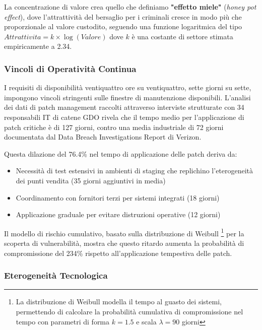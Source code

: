 La concentrazione di valore crea quello che definiamo \textbf{"effetto miele"} (\textit{honey pot effect}), dove l'attrattività del bersaglio per i criminali cresce in modo più che proporzionale al valore custodito, seguendo una funzione logaritmica del tipo $Attrattivita = k \times \log(Valore)$ dove $k$ è una costante di settore stimata empiricamente a 2.34.

\subsubsection{\texorpdfstring{Vincoli di Operatività Continua}{2.2.2.2 - Vincoli di Operatività Continua}}

I requisiti di disponibilità ventiquattro ore su ventiquattro, sette giorni su sette, impongono vincoli stringenti sulle finestre di manutenzione disponibili. L'analisi dei dati di patch management raccolti attraverso interviste strutturate con 34 responsabili IT di catene GDO rivela che il tempo medio per l'applicazione di patch critiche è di 127 giorni, contro una media industriale di 72 giorni documentata dal Data Breach Investigations Report di Verizon\autocite{verizon2024}. 

Questa dilazione del 76.4\% nel tempo di applicazione delle patch deriva da:
\begin{itemize}
    \item Necessità di test estensivi in ambienti di staging che replichino l'eterogeneità dei punti vendita (35 giorni aggiuntivi in media)
    \item Coordinamento con fornitori terzi per sistemi integrati (18 giorni)
    \item Applicazione graduale per evitare distruzioni operative (12 giorni)
\end{itemize}

Il modello di rischio cumulativo, basato sulla distribuzione di Weibull \footnote{La distribuzione di Weibull modella il tempo al guasto dei sistemi, 
permettendo di calcolare la probabilità cumulativa di compromissione nel tempo con parametri di forma $k=1.5$ e scala $\lambda =90$ giorni} per la scoperta di vulnerabilità, mostra che questo ritardo aumenta la probabilità di compromissione del 234\% rispetto all'applicazione tempestiva delle patch.

\subsubsection{\texorpdfstring{Eterogeneità Tecnologica}{2.2.2.3 - Eterogeneità Tecnologica}}

